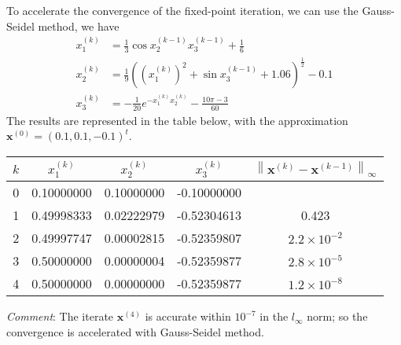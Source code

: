 \documentclass[../main-sheet.tex]{subfiles}
\begin{document}
\begin{ex}
    To accelerate the convergence of the fixed-point iteration, we can use the Gauss-Seidel method, we have
    \begin{align*}
        x_1^{(k)} &= \frac{1}{3}\cos x_2^{(k-1)}x_3^{(k-1)}+\frac{1}{6}\\
        x_2^{(k)} &= \frac{1}{9}\left(\left(x_1^{(k)}\right)^2+\sin x_3^{(k-1)}+1.06\right)^{\frac{1}{2}}-0.1\\
        x_3^{(k)} &= -\frac{1}{20}e^{-x_1^{(k)} x_2^{(k)}}-\frac{10\pi -3}{60}
    \end{align*}
    The results are represented in the table below, with the approximation \(\mathbf{x}^{(0)}=(0.1,0.1,-0.1)^t\).
    \begin{table}[H]
        \centering
        \begin{tabular}{clllc}
            \toprule
            \(k\) & \multicolumn{1}{c}{\(x_1^{(k)}\)} & \multicolumn{1}{c}{\(x_2^{(k)}\)} & \multicolumn{1}{c}{\(x_3^{(k)}\)} & \(\left\|\mathbf{x}^{(k)}-\mathbf{x}^{(k-1)}\right\|_\infty\)\\\midrule
            0 & 0.10000000 & 0.10000000 & -0.10000000 & \\
            1 & 0.49998333 & 0.02222979 & -0.52304613 & 0.423 \\
            2 & 0.49997747 & 0.00002815 & -0.52359807 & \(2.2\times 10^{-2}\) \\
            3 & 0.50000000 & 0.00000004 & -0.52359877 & \(2.8\times 10^{-5}\) \\
            4 & 0.50000000 & 0.00000000 & -0.52359877 & \(1.2\times 10^{-8}\) \\
            \bottomrule
        \end{tabular}
    \end{table}
    \emph{Comment}: The iterate \(\mathbf{x}^{(4)}\) is accurate within \(10^{-7}\) in the \(l_\infty\) norm; so the convergence is accelerated with Gauss-Seidel method.
\end{ex}
\end{document}
